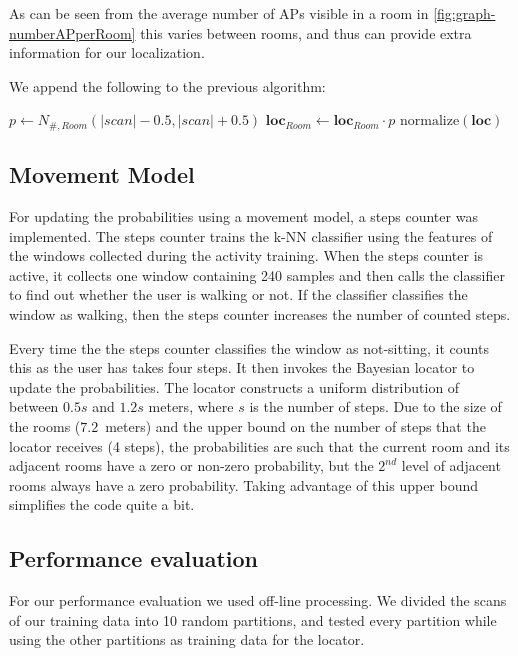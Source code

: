 \documentclass[a4paper,10pt,twoside]{IEEEtran}
\begin{document}
As can be seen from the average number of APs visible in a room in \autoref{fig:graph-numberAPperRoom} this varies between rooms, and thus can provide extra information for our localization.

We append the following to the previous algorithm:
\\
\begin{algorithmic}
			\State $p \gets N_{\#,Room}(|scan|-0.5,|scan|+0.5)$
			\State $\mathbf{loc}_{Room} \gets \mathbf{loc}_{Room} \cdot p $
		\EndFor
		\State $\text{normalize}\left(\mathbf{loc}\right)$
	\EndIf
\end{algorithmic}

\subsection{Movement Model}
\label{sec:loc-movement-model}
For updating the probabilities using a movement model, a steps counter was implemented. The steps counter trains the k-NN classifier using the features of the windows collected during the activity training. When the steps counter is active, it collects one window containing 240 samples and then calls the classifier to find out whether the user is walking or not. If the classifier classifies the window as walking, then the steps counter increases the number of counted steps.

Every time the the steps counter classifies the window as not-sitting, it counts this as the user has takes four steps. It then invokes the Bayesian locator to update the probabilities. The locator constructs a uniform distribution of between $0.5s$ and $1.2s$ meters, where $s$ is the number of steps. Due to the size of the rooms ($7.2$~meters) and the upper bound on the number of steps that the locator receives (4 steps), the probabilities are such that the current room and its adjacent rooms have a zero or non-zero probability, but the $2^{nd}$ level of adjacent rooms always have a zero probability. Taking advantage of this upper bound simplifies the code quite a bit.

\subsection{Performance evaluation}
\label{sec:loc-evaluation}

For our performance evaluation we used off-line processing. We divided the scans of our training data into 10 random partitions, and tested every partition while using the other partitions as training data for the locator.
\end{document}
